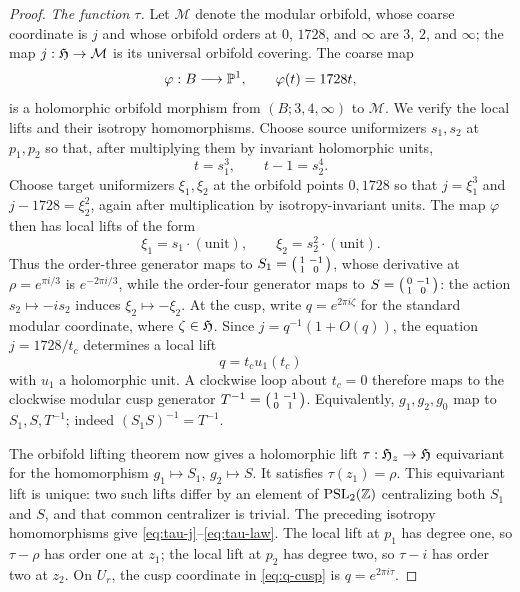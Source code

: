 \begin{proof}
\smallskip
\noindent\emph{The function $\tau$.}
Let $\mathcal M$ denote the modular orbifold, whose coarse coordinate is
$j$ and whose orbifold orders at $0$, $1728$, and $\infty$ are
$3$, $2$, and $\infty$; the map $j:\mathfrak H\to\mathcal M$ is its universal
orbifold covering.  The coarse map
\[
 \varphi:B\longrightarrow\mathbb P^1,
 \qquad \varphi(t)=1728t,
\]
is a holomorphic orbifold morphism from
$(B;3,4,\infty)$ to $\mathcal M$.  We verify the local lifts and their
isotropy homomorphisms.  Choose source uniformizers $s_1,s_2$ at
$p_1,p_2$ so that, after multiplying them by invariant holomorphic units,
\[
 t=s_1^3,\qquad t-1=s_2^4.
\]
Choose target uniformizers $\xi_1,\xi_2$ at the orbifold points $0,1728$ so
that $j=\xi_1^3$ and $j-1728=\xi_2^2$, again after multiplication by
isotropy-invariant units.
The map $\varphi$ then has local lifts of the form
\[
 \xi_1=s_1\cdot(\text{unit}),
 \qquad
 \xi_2=s_2^2\cdot(\text{unit}).
\]
Thus the order-three generator maps to
$S_1=\begin{psmallmatrix}1&-1\\1&0\end{psmallmatrix}$, whose derivative
at $\rho=e^{\pi i/3}$ is $e^{-2\pi i/3}$, while the order-four generator
maps to
$S=\begin{psmallmatrix}0&-1\\1&0\end{psmallmatrix}$: the action
$s_2\mapsto-is_2$ induces $\xi_2\mapsto-\xi_2$.  At the cusp, write $q=e^{2\pi i\zeta}$ for the standard modular
coordinate, where $\zeta\in\mathfrak H$.  Since
$j=q^{-1}(1+O(q))$, the equation $j=1728/t_c$ determines a local lift
\begin{equation}\label{eq:q-cusp}
 q=t_cu_1(t_c)
\end{equation}
with $u_1$ a holomorphic unit.  A clockwise loop about $t_c=0$ therefore
maps to the clockwise modular cusp generator
$T^{-1}=\begin{psmallmatrix}1&-1\\0&1\end{psmallmatrix}$.  Equivalently,
$g_1,g_2,g_0$ map to $S_1,S,T^{-1}$; indeed
$(S_1S)^{-1}=T^{-1}$.

The orbifold lifting theorem \cite[Chs.~7,10]{Beardon} now gives a holomorphic lift
$\tau:\mathfrak H_z\to\mathfrak H$ equivariant for the homomorphism
$g_1\mapsto S_1$, $g_2\mapsto S$.  It satisfies $\tau(z_1)=\rho$.
This equivariant lift is unique: two such lifts differ by an element of
$\mathrm{PSL}_2(\mathbb Z)$ centralizing both $S_1$ and $S$, and that common
centralizer is trivial.  The preceding isotropy homomorphisms give
\eqref{eq:tau-j}--\eqref{eq:tau-law}.  The local lift at $p_1$ has degree
one, so $\tau-\rho$ has order one at $z_1$; the local lift at $p_2$ has
degree two, so $\tau-i$ has order two at $z_2$.  On $U_r$, the cusp
coordinate in \eqref{eq:q-cusp} is $q=e^{2\pi i\tau}$.


\end{proof}
